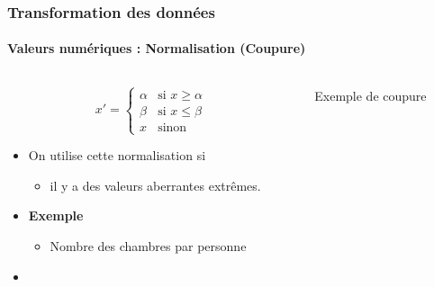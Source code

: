 \documentclass[xcolor=table]{beamer}
\begin{document}
\begin{frame}
	\frametitle{Transformation des données}
	\framesubtitle{Valeurs numériques : Normalisation (Coupure)}
	
	\begin{columns}
	\begin{column}{.5\textwidth}
	\[x' = \begin{cases}
	\alpha & \text{si } x \ge \alpha \\
	\beta & \text{si } x \le \beta \\
	x & \text{sinon}
	\end{cases}
	\]
	
	\begin{itemize}
		\item On utilise cette normalisation si
		\begin{itemize}
			\item il y a des valeurs aberrantes extrêmes.
		\end{itemize}
		\item \textbf{Exemple}
		\begin{itemize}
			\item Nombre des chambres par personne
		\end{itemize}
		\item {}
	\end{itemize}
	\end{column}
	\begin{column}{.5\textwidth}
		
		\begin{center}
			Exemple de coupure \cite{2021-google-prep}
		\end{center}
	\end{column}
 \end{columns}
	
\end{frame}
\end{document}
